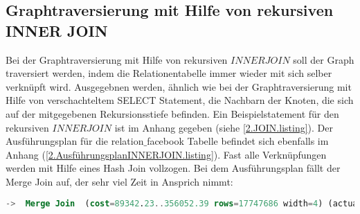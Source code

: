 \subsection{Graphtraversierung mit Hilfe von rekursiven INNER JOIN}
\label{2.postgresInnerJoin.subsection}
Bei der Graphtraversierung mit Hilfe von rekursiven $INNER JOIN$ soll der Graph traversiert werden, indem die Relationentabelle immer wieder mit sich selber verknüpft wird.
Ausgegebnen werden, ähnlich wie bei der Graphtraversierung mit Hilfe von verschachteltem SELECT Statement, die Nachbarn der Knoten, die sich auf der mitgegebenen Rekursionsstiefe befinden.
Ein Beispielstatement für den rekursiven $INNER JOIN$ ist im Anhang gegeben (siehe \ref{2.JOIN.listing}).
Der Ausführungsplan für die relation$\_$facebook Tabelle befindet sich ebenfalls im Anhang (\ref{2.AusführungsplanINNERJOIN.listing}).
Fast alle Verknüpfungen werden mit Hilfe eines Hash Join vollzogen.
Bei dem Ausführungsplan fällt der Merge Join auf, der sehr viel Zeit in Ansprich nimmt:
\begin{lstlisting}[language=SQL,caption = Merge JOIN,frame=single, label={2.mergeJoin.listing} ]
    ->  Merge Join  (cost=89342.23..356052.39 rows=17747686 width=4) (actual time=112.509..1178.121 rows=8863706 loops=1)
\end{lstlisting}